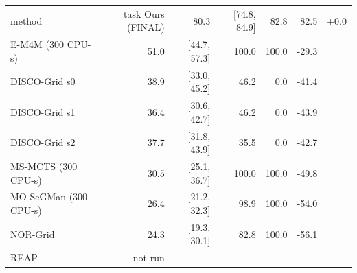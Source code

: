 \begin{tabular}{lrrrrr}
\toprule
method & task %
\midrule
Ours (FINAL) & 80.3 & [74.8, 84.9] & 82.8 & 82.5 & +0.0 \\
E-M4M (300 CPU-s) & 51.0 & [44.7, 57.3] & 100.0 & 100.0 & -29.3 \\
DISCO-Grid s0 & 38.9 & [33.0, 45.2] & 46.2 & 0.0 & -41.4 \\
DISCO-Grid s1 & 36.4 & [30.6, 42.7] & 46.2 & 0.0 & -43.9 \\
DISCO-Grid s2 & 37.7 & [31.8, 43.9] & 35.5 & 0.0 & -42.7 \\
MS-MCTS (300 CPU-s) & 30.5 & [25.1, 36.7] & 100.0 & 100.0 & -49.8 \\
MO-SeGMan (300 CPU-s) & 26.4 & [21.2, 32.3] & 98.9 & 100.0 & -54.0 \\
NOR-Grid & 24.3 & [19.3, 30.1] & 82.8 & 100.0 & -56.1 \\
REAP & not run & - & - & - & - \\
\bottomrule
\end{tabular}
